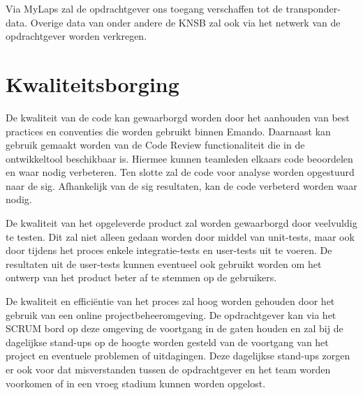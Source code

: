 Via MyLaps zal de opdrachtgever ons toegang verschaffen tot de transponder-data. Overige data van onder andere de KNSB zal ook via het netwerk van de opdrachtgever worden verkregen.

\section{Kwaliteitsborging}
De kwaliteit van de code kan gewaarborgd worden door het aanhouden van best practices en conventies die worden gebruikt binnen Emando. Daarnaast kan gebruik gemaakt worden van de Code Review functionaliteit die in de ontwikkeltool beschikbaar is. Hiermee kunnen teamleden elkaars code beoordelen en waar nodig verbeteren. Ten slotte zal de code voor analyse worden opgestuurd naar de \ac{sig}. Afhankelijk van de \ac{sig} resultaten, kan de code verbeterd worden waar nodig.

De kwaliteit van het opgeleverde product zal worden gewaarborgd door veelvuldig te testen. Dit zal niet alleen gedaan worden door middel van unit-tests, maar ook door tijdens het proces enkele integratie-tests en user-tests uit te voeren. De resultaten uit de user-tests kunnen eventueel ook gebruikt worden om het ontwerp van het product beter af te stemmen op de gebruikers.

De kwaliteit en effici\"entie van het proces zal hoog worden gehouden door het gebruik van een online projectbeheeromgeving. De opdrachtgever kan via het SCRUM bord op deze omgeving de voortgang in de gaten houden en zal bij de dagelijkse stand-ups op de hoogte worden gesteld van de voortgang van het project en eventuele problemen of uitdagingen. Deze dagelijkse stand-ups zorgen er ook voor dat misverstanden tussen de opdrachtgever en het team worden voorkomen of in een vroeg stadium kunnen worden opgelost.